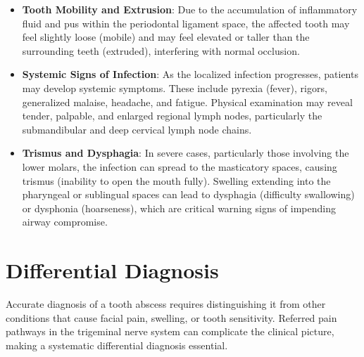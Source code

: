 \begin{itemize}
  \item \textbf{Tooth Mobility and Extrusion}: Due to the accumulation of inflammatory fluid and pus within the periodontal ligament space, the affected tooth may feel slightly loose (mobile) and may feel elevated or taller than the surrounding teeth (extruded), interfering with normal occlusion.
  \item \textbf{Systemic Signs of Infection}: As the localized infection progresses, patients may develop systemic symptoms. These include pyrexia (fever), rigors, generalized malaise, headache, and fatigue. Physical examination may reveal tender, palpable, and enlarged regional lymph nodes, particularly the submandibular and deep cervical lymph node chains.
  \item \textbf{Trismus and Dysphagia}: In severe cases, particularly those involving the lower molars, the infection can spread to the masticatory spaces, causing trismus (inability to open the mouth fully). Swelling extending into the pharyngeal or sublingual spaces can lead to dysphagia (difficulty swallowing) or dysphonia (hoarseness), which are critical warning signs of impending airway compromise.
\end{itemize}

\section*{Differential Diagnosis}
Accurate diagnosis of a tooth abscess requires distinguishing it from other conditions that cause facial pain, swelling, or tooth sensitivity. Referred pain pathways in the trigeminal nerve system can complicate the clinical picture, making a systematic differential diagnosis essential.


